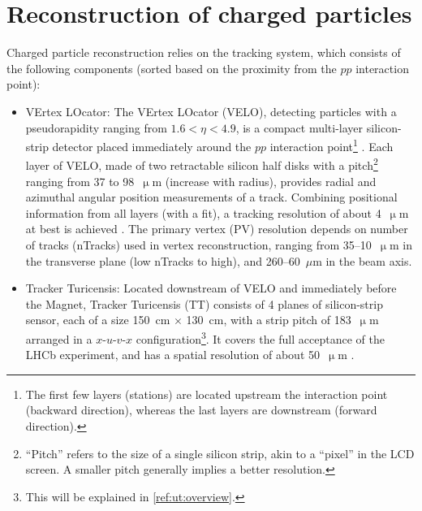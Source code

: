 \section{Reconstruction of charged particles}
\label{ref:detector:tracking}

Charged particle reconstruction relies on the tracking system,
which consists of the following components
(sorted based on the proximity from the $pp$ interaction point):

\begin{itemize}
    \item VErtex LOcator:
        The VErtex LOcator (VELO),
        detecting particles with a pseudorapidity ranging from
        $1.6 < \eta < 4.9$,
        is a compact multi-layer silicon-strip detector placed immediately
        around the $pp$ interaction point\footnote{
            The first few layers (stations) are located upstream the interaction
            point (backward direction),
            whereas the last layers are downstream (forward direction).
        }
        \cite{The_LHCb_Collaboration_2008}.
        Each layer of VELO,
        made of two retractable silicon half disks with a pitch\footnote{
            ``Pitch'' refers to the size of a single silicon strip, akin to a
            ``pixel'' in the LCD screen.
            A smaller pitch generally implies a better resolution.
        } ranging from 37 to 98~$\upmu$m (increase with radius),
        provides radial and azimuthal angular position measurements of a track.
        Combining positional information from all layers (with a fit),
        a tracking resolution of about 4~$\upmu$m at best is achieved
        \cite{Aaij_2014}.
        The primary vertex (PV) resolution depends on number of tracks (nTracks)
        used in vertex reconstruction,
        ranging from 35--10~$\upmu$m in the transverse plane
        (low nTracks to high),
        and 260--60~$\mu$m in the beam axis.

    \item Tracker Turicensis:
        Located downstream of VELO and immediately before the Magnet,
        Tracker Turicensis (TT) consists of 4 planes of silicon-strip sensor,
        each of a size 150~cm $\times$ 130~cm,
        with a strip pitch of 183~$\upmu$m arranged in a $x$-$u$-$v$-$x$
        configuration\footnote{
            This will be explained in \cref{ref:ut:overview}.
        }.
        It covers the full acceptance of the LHCb experiment, and has a spatial
        resolution of about 50~$\upmu$m
        \cite{The_LHCb_Collaboration_2008}.


\end{itemize}
